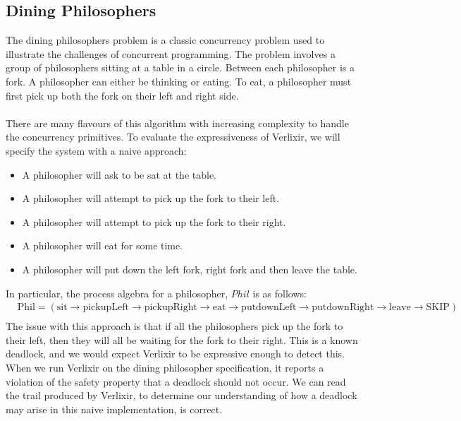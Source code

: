 \subsection{Dining Philosophers} \label{sec:dp}
The dining philosophers problem is a classic concurrency problem used to illustrate the challenges of concurrent programming. The problem involves a group of philosophers sitting at a table in a circle. Between each philosopher is a fork. A philosopher can either be thinking or eating. To eat, a philosopher must first pick up both the fork on their left and right side.
\\ \\
There are many flavours of this algorithm with increasing complexity to handle the concurrency primitives. To evaluate the expressiveness of Verlixir, we will specify the system with a naive approach:
\begin{itemize}
    \item A philosopher will ask to be sat at the table.
    \item A philosopher will attempt to pick up the fork to their left.
    \item A philosopher will attempt to pick up the fork to their right.
    \item A philosopher will eat for some time.
    \item A philosopher will put down the left fork, right fork and then leave the table.
\end{itemize}
In particular, the process algebra for a philosopher, $Phil$ is as follows:
\[
\begin{aligned}
    & \text{Phil} = ( \text{sit} \rightarrow \text{pickupLeft} \rightarrow \text{pickupRight} \rightarrow \text{eat} \rightarrow \text{putdownLeft} \rightarrow \text{putdownRight} \rightarrow \text{leave} \rightarrow \text{SKIP}) \\
\end{aligned}
\]
The issue with this approach is that if all the philosophers pick up the fork to their left, then they will all be waiting for the fork to their right. This is a known deadlock, and we would expect Verlixir to be expressive enough to detect this. When we run Verlixir on the dining philosopher specification, it reports a violation of the safety property that a deadlock should not occur. We can read the trail produced by Verlixir, to determine our understanding of how a deadlock may arise in this naive implementation, is correct.
\\ \\
